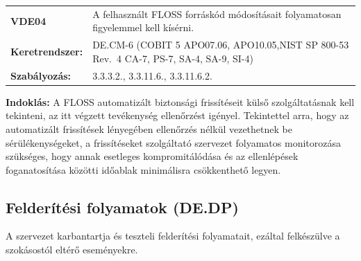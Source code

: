 \documentclass[12pt,magyar,a4paper,oneside]{scrreprt}
\begin{document}
\begin{longtable}[]{@{}ll@{}}
\toprule
\endhead
\begin{minipage}[t]{0.16\columnwidth}\raggedright
\textbf{VDE04}\strut
\end{minipage} & \begin{minipage}[t]{0.79\columnwidth}\raggedright
A felhasznált FLOSS forráskód módosításait folyamatosan figyelemmel kell
kísérni.\strut
\end{minipage}\tabularnewline
\begin{minipage}[t]{0.16\columnwidth}\raggedright
\textbf{Keretrendszer:}\strut
\end{minipage} & \begin{minipage}[t]{0.79\columnwidth}\raggedright
DE.CM-6 (COBIT 5 APO07.06, APO10.05,NIST SP 800-53 Rev.~4 CA-7, PS-7,
SA-4, SA-9, SI-4)\strut
\end{minipage}\tabularnewline
\begin{minipage}[t]{0.16\columnwidth}\raggedright
\textbf{Szabályozás:}\strut
\end{minipage} & \begin{minipage}[t]{0.79\columnwidth}\raggedright
3.3.3.2., 3.3.11.6., 3.3.11.6.2.\strut
\end{minipage}\tabularnewline
\bottomrule
\end{longtable}

\textbf{Indoklás: } A FLOSS automatizált biztonsági frissítéseit külső
szolgáltatásnak kell tekinteni, az itt végzett tevékenység ellenőrzést
igényel. Tekintettel arra, hogy az automatizált frissítések lényegében
ellenőrzés nélkül vezethetnek be sérülékenységeket, a frissítéseket
szolgáltató szervezet folyamatos monitorozása szükséges, hogy annak
esetleges kompromitálódása és az ellenlépések foganatosítása közötti
időablak minimálisra csökkenthető legyen.

\hypertarget{felderuxedtuxe9si-folyamatok-de.dp}{%
\subsection{Felderítési folyamatok
(DE.DP)}\label{felderuxedtuxe9si-folyamatok-de.dp}}

A szervezet karbantartja és teszteli felderítési folyamatait, ezáltal
felkészülve a szokásostól eltérő eseményekre.
\end{document}
